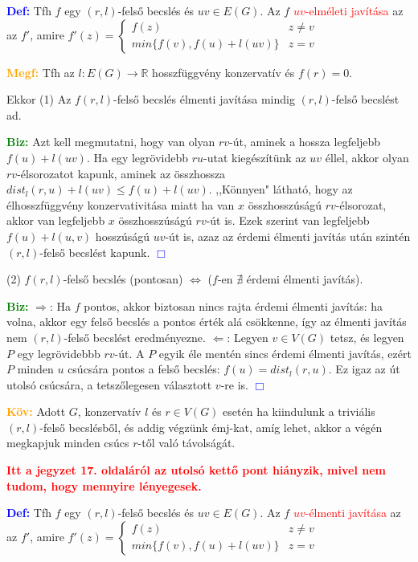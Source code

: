 \documentclass[../szamtud.tex]{subfiles}
\begin{document}
			\textbf{\textcolor{blue}{Def:}} Tfh $f$ egy $(r,l)$-felső becslés és $uv \in E(G)$. Az $f$ \textcolor{red}{$uv$-elméleti javítása} az az $f'$, amire 
			$
				f'(z) = \begin{cases}
					f(z) & z \neq v \\
					min\{f(v), f(u) + l(uv)\} & z = v
				\end{cases}
			$

			\textbf{\textcolor{orange}{Megf:}} Tfh az $l:E(G)\rightarrow \mathbb{R}$ hosszfüggvény konzervatív és $f(r) = 0$. 
			
			Ekkor (1) Az $f (r,l)$-felső becslés élmenti javítása mindig $(r,l)$-felső becslést ad.

			\textbf{\textcolor{green}{Biz:}} Azt kell megmutatni, hogy van  olyan $rv$-út, aminek a hossza legfeljebb $f(u) + l(uv)$. Ha egy legrövidebb $ru$-utat kiegészítünk az $uv$ éllel, akkor olyan $rv$-élsorozatot kapunk, aminek az összhossza $dist_l (r,u) + l(uv) \leq f(u) + l(uv)$. ,,Könnyen" látható, hogy  az élhosszfüggvény konzervativitása miatt ha van $x$ összhosszúságú $rv$-élsorozat, akkor van legfeljebb $x$ összhosszúságú $rv$-út is. Ezek szerint van legfeljebb $f(u) + l(u,v)$ hosszúságú $uv$-út is, azaz az érdemi élmenti javítás után szintén $(r,l)$-felső becslést kapunk.   \textcolor{blue}{$\Box$} 

			(2) $f (r,l)$-felső becslés (pontosan) $\Longleftrightarrow$ ($f$-en $\nexists$ érdemi élmenti javítás).

			\textcolor{green}{\textbf{Biz:}}  $\Rightarrow$: Ha $f$ pontos, akkor biztosan nincs rajta érdemi élmenti javítás: ha volna, akkor egy felső becslés a pontos érték alá csökkenne, így az élmenti javítás nem  $(r,l)$-felső becslést eredményezne. $\Leftarrow$: Legyen $v \in V(G)$ tetsz, és legyen $P$ egy legrövidebbb $rv$-út. A $P$ egyik éle mentén sincs érdemi élmenti javítás, ezért $P$ minden $u$ csúcsára pontos a felső becslés: $f(u) = dist_l(r,u)$. Ez igaz az út utolsó csúcsára, a tetszőlegesen választott $v$-re is.  \textcolor{blue}{$\Box$}

			\textbf{\textcolor{orange}{Köv:}} Adott $G$, konzervatív $l$ és $r \in V(G)$ esetén ha kiindulunk a triviális $(r,l)$-felső becslésből, és addig végzünk émj-kat, amíg lehet, akkor a végén megkapjuk minden csúcs $r$-től való távolságát.

			\textbf{\textcolor{red}{Itt a jegyzet 17. oldaláról az utolsó kettő pont hiányzik, mivel nem tudom, hogy mennyire lényegesek.}}

			\textbf{\textcolor{blue}{Def:}} Tfh $f$ egy $(r,l)$-felső becslés és $uv \in E(G)$. Az $f$ \textcolor{red}{$uv$-élmenti javítása} az az $f'$, amire 
			$
				f'(z) = \begin{cases}
					f(z) & z \neq v \\
					min\{f(v), f(u) + l(uv)\} & z = v
				\end{cases}
			$
\end{document}
